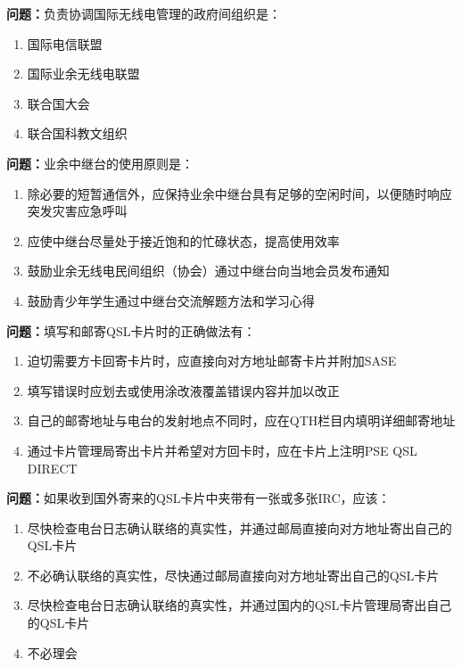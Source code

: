 \bigskip


\noindent\textbf{问题：}负责协调国际无线电管理的政府间组织是：
\begin{enumerate}[label=\Alph*), leftmargin=3em]
\item 国际电信联盟
\item 国际业余无线电联盟
\item 联合国大会
\item 联合国科教文组织
\end{enumerate}

\bigskip


\noindent\textbf{问题：}业余中继台的使用原则是：
\begin{enumerate}[label=\Alph*), leftmargin=3em]
\item 除必要的短暂通信外，应保持业余中继台具有足够的空闲时间，以便随时响应突发灾害应急呼叫
\item 应使中继台尽量处于接近饱和的忙碌状态，提高使用效率
\item 鼓励业余无线电民间组织（协会）通过中继台向当地会员发布通知
\item 鼓励青少年学生通过中继台交流解题方法和学习心得
\end{enumerate}

\bigskip


\noindent\textbf{问题：}填写和邮寄QSL卡片时的正确做法有：
\begin{enumerate}[label=\Alph*), leftmargin=3em]
\item 迫切需要方卡回寄卡片时，应直接向对方地址邮寄卡片并附加SASE
\item 填写错误时应划去或使用涂改液覆盖错误内容并加以改正
\item 自己的邮寄地址与电台的发射地点不同时，应在QTH栏目内填明详细邮寄地址
\item 通过卡片管理局寄出卡片并希望对方回卡时，应在卡片上注明PSE QSL DIRECT
\end{enumerate}

\bigskip


\noindent\textbf{问题：}如果收到国外寄来的QSL卡片中夹带有一张或多张IRC，应该：
\begin{enumerate}[label=\Alph*), leftmargin=3em]
\item 尽快检查电台日志确认联络的真实性，并通过邮局直接向对方地址寄出自己的QSL卡片
\item 不必确认联络的真实性，尽快通过邮局直接向对方地址寄出自己的QSL卡片
\item 尽快检查电台日志确认联络的真实性，并通过国内的QSL卡片管理局寄出自己的QSL卡片
\item 不必理会
\end{enumerate}

